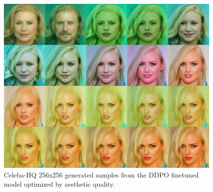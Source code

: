 \begin{appendixs}
        \begin{figure}
            \centering
            \includegraphics[scale=1.40]{img/results/laion_12.png}
            \vspace{-0pt}  %
            \captionsetup{width=\textwidth} %
            \caption{Celeba-HQ 256x256 generated samples from the DDPO finetuned model optimized by aesthetic quality.}
            \label{fig:ddpm-to-ddpo-aesthetic-extra2}
        \end{figure}


\end{appendixs}
